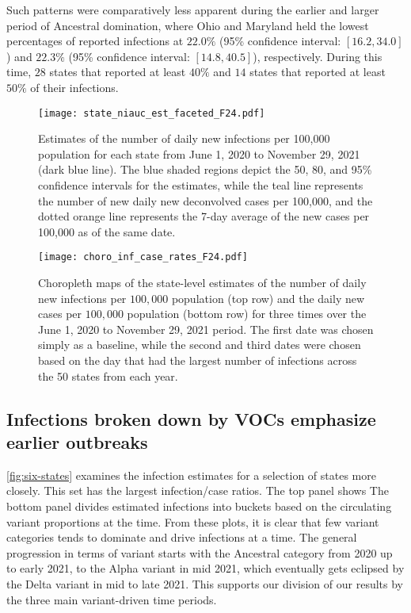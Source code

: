 Such patterns were comparatively less apparent during the earlier and larger
period of Ancestral domination, where Ohio and Maryland held the lowest
percentages of reported infections at $22.0\%$ (95\% confidence interval:
$[16.2, 34.0]$) and $22.3\%$ (95\% confidence interval: $[14.8, 40.5]$),
respectively. During this time, $28$ states that reported at least $40\%$ and
$14$ states that reported at least $50\%$ of their infections. 

\begin{figure}[!tb]
    \centering
        \texttt{[image: state\_niauc\_est\_faceted\_F24.pdf]} 
        \caption{Estimates of the number of daily new infections per 100,000
            population for each \US state from June 1, 2020 to November 29, 2021
            (dark blue line). The blue shaded regions depict the 50, 80, and 95\%
            confidence intervals for the estimates, while the teal line represents
            the number of new daily new deconvolved cases per 100,000, and the
            dotted orange line represents the 7-day average of the new cases per
            100,000 as of the same date.}
        \label{fig:state_infect_est}
    \end{figure}
    

\begin{figure}[!tb]
\centering
    \texttt{[image: choro\_inf\_case\_rates\_F24.pdf]}
    \caption{Choropleth maps of the state-level estimates of the number of daily
    new infections per $100,000$ population (top row) and the daily new cases
    per $100,000$ population (bottom row) for three times over the June 1, 2020
    to November 29, 2021 period. The first date was chosen simply as a baseline,
    while the second and third dates were chosen based on the day that had the
    largest number of infections across the 50 states from each year.} 
    \label{fig:choro_inf_case_rates}
\end{figure}    



    
\subsection{Infections broken down by VOCs emphasize earlier outbreaks}
\label{sec:infections-by-voc}

\autoref{fig:six-states} examines the infection estimates for a selection of
states more closely. This set has the largest infection/case ratios. 
 The top
panel shows  The bottom panel divides estimated
infections into buckets based on the circulating variant proportions at the
time. From these plots, it is clear that few variant categories tends to
dominate and drive infections at a time. The general progression in terms of
variant starts with the Ancestral category from 2020 up to early 2021, to the
Alpha variant in mid 2021, which eventually gets eclipsed by the Delta variant
in mid to late 2021. This supports our division of our results by the three main
variant-driven time periods.


